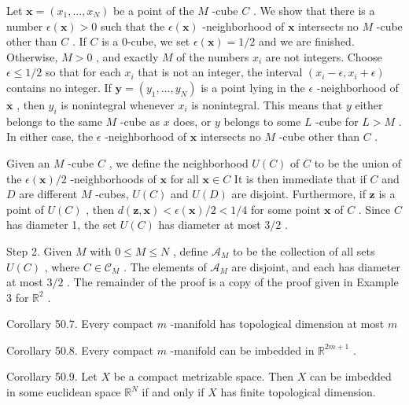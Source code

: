 \documentclass[10pt]{article}
\begin{document}
Let \(\mathbf{x} = \left( {{x}_{1},\ldots ,{x}_{N}}\right)\) be a point of the \(M\) -cube \(C\) . We show that there is a number \(\epsilon \left( \mathbf{x}\right)  > 0\) such that the \(\epsilon \left( \mathbf{x}\right)\) -neighborhood of \(\mathbf{x}\) intersects no \(M\) -cube other than \(C\) . If \(C\) is a 0-cube, we set \(\epsilon \left( \mathbf{x}\right)  = 1/2\) and we are finished. Otherwise, \(M > 0\) , and exactly \(M\) of the numbers \({x}_{i}\) are not integers. Choose \(\epsilon  \leq  1/2\) so that for each \({x}_{i}\) that is not an integer, the interval \(\left( {{x}_{i} - \epsilon ,{x}_{i} + \epsilon }\right)\) contains no integer. If \(\mathbf{y} = \left( {{y}_{1},\ldots ,{y}_{N}}\right)\) is a point lying in the \(\epsilon\) -neighborhood of \(\mathbf{x}\) , then \({y}_{i}\) is nonintegral whenever \({x}_{i}\) is nonintegral. This means that \(y\) either belongs to the same \(M\) -cube as \(x\) does, or \(y\) belongs to some \(L\) -cube for \(L > M\) . In either case, the \(\epsilon\) -neighborhood of \(\mathbf{x}\) intersects no \(M\) -cube other than \(C\) .

Given an \(M\) -cube \(C\) , we define the neighborhood \(U\left( C\right)\) of \(C\) to be the union of the \(\epsilon \left( \mathbf{x}\right) /2\) -neighborhoods of \(\mathbf{x}\) for all \(\mathbf{x} \in  C\) It is then immediate that if \(C\) and \(D\) are different \(M\) -cubes, \(U\left( C\right)\) and \(U\left( D\right)\) are disjoint. Furthermore, if \(\mathbf{z}\) is a point of \(U\left( C\right)\) , then \(d\left( {\mathbf{z},\mathbf{x}}\right)  < \epsilon \left( \mathbf{x}\right) /2 < 1/4\) for some point \(\mathbf{x}\) of \(C\) . Since \(C\) has diameter 1, the set \(U\left( C\right)\) has diameter at most \(3/2\) .

Step 2. Given \(M\) with \(0 \leq  M \leq  N\) , define \({\mathcal{A}}_{M}\) to be the collection of all sets \(U\left( C\right)\) , where \(C \in  {\mathcal{C}}_{M}\) . The elements of \({\mathcal{A}}_{M}\) are disjoint, and each has diameter at most \(3/2\) . The remainder of the proof is a copy of the proof given in Example 3 for \({\mathbb{R}}^{2}\) .

Corollary 50.7. Every compact \(m\) -manifold has topological dimension at most \(m\)

Corollary 50.8. Every compact \(m\) -manifold can be imbedded in \({\mathbb{R}}^{{2m} + 1}\) .

Corollary 50.9. Let \(X\) be a compact metrizable space. Then \(X\) can be imbedded in some euclidean space \({\mathbb{R}}^{N}\) if and only if \(X\) has finite topological dimension.
\end{document}
